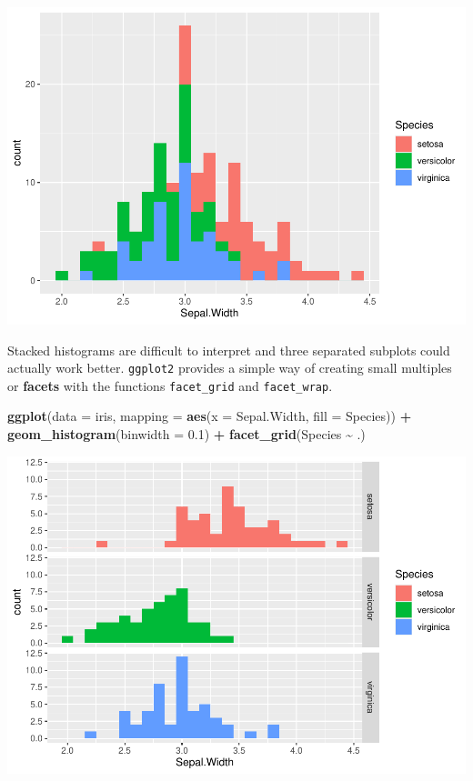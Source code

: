 \documentclass[
]{article}
\newenvironment{Shaded}{\begin{snugshade}}{\end{snugshade}}
\newcommand{\AttributeTok}[1]{\textcolor[rgb]{0.13,0.29,0.53}{#1}}
\newcommand{\FloatTok}[1]{\textcolor[rgb]{0.00,0.00,0.81}{#1}}
\newcommand{\FunctionTok}[1]{\textcolor[rgb]{0.13,0.29,0.53}{\textbf{#1}}}
\newcommand{\NormalTok}[1]{#1}
\newcommand{\SpecialCharTok}[1]{\textcolor[rgb]{0.81,0.36,0.00}{\textbf{#1}}}
\begin{document}
\begin{center}\includegraphics{P1_exercises_files/figure-latex/histogram-fill-1} \end{center}

Stacked histograms are difficult to interpret and three separated
subplots could actually work better. \texttt{ggplot2} provides a simple
way of creating small multiples or \textbf{facets} with the functions
\texttt{facet\_grid} and \texttt{facet\_wrap}.

\begin{Shaded}
\begin{Highlighting}[]
\FunctionTok{ggplot}\NormalTok{(}\AttributeTok{data =}\NormalTok{ iris, }\AttributeTok{mapping =} \FunctionTok{aes}\NormalTok{(}\AttributeTok{x =}\NormalTok{ Sepal.Width, }\AttributeTok{fill =}\NormalTok{ Species)) }\SpecialCharTok{+}
  \FunctionTok{geom\_histogram}\NormalTok{(}\AttributeTok{binwidth =} \FloatTok{0.1}\NormalTok{) }\SpecialCharTok{+}
  \FunctionTok{facet\_grid}\NormalTok{(Species }\SpecialCharTok{\textasciitilde{}}\NormalTok{ .)}
\end{Highlighting}
\end{Shaded}

\begin{center}\includegraphics{P1_exercises_files/figure-latex/facets-1} \end{center}
\end{document}
